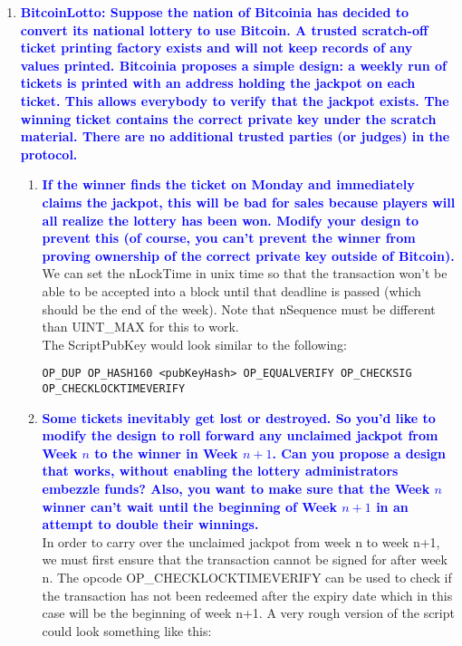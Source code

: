 \documentclass[11pt]{article}
\begin{document}
\begin{enumerate}
\item \textbf{\textcolor{blue}{BitcoinLotto: Suppose the nation of Bitcoinia has decided to convert its national lottery to use Bitcoin. A trusted scratch-off ticket printing factory exists and will not keep records of any values printed. Bitcoinia proposes a simple design: a weekly run of tickets is printed with an address holding the jackpot on each ticket. This allows everybody to verify that the jackpot exists. The winning ticket contains the correct private key under the scratch material. There are no additional trusted parties (or judges) in the protocol.}}
    \begin{enumerate}
    \item \textbf{\textcolor{blue}{If the winner finds the ticket on Monday and immediately claims the jackpot, this will be bad for sales because players will all realize the lottery has been won. Modify your design to prevent this (of course, you can’t prevent the winner from proving ownership of the correct private key outside of Bitcoin).}}
        \\ We can set the nLockTime in unix time so that the transaction won't be able to be accepted into a block until that deadline is passed (which should be the end of the week). Note that nSequence must be different than UINT\_MAX for this to work.
        \\ The ScriptPubKey would look similar to the following:
        \begin{verbatim}
OP_DUP OP_HASH160 <pubKeyHash> OP_EQUALVERIFY OP_CHECKSIG OP_CHECKLOCKTIMEVERIFY
        \end{verbatim}
        
    \item \textbf{\textcolor{blue}{Some tickets inevitably get lost or destroyed. So you’d like to modify the design to roll forward any unclaimed jackpot from Week $n$ to the winner in Week $n+1$. Can you propose a design that works, without enabling the lottery administrators embezzle funds? Also, you want to make sure that the Week $n$ winner can’t wait until the beginning of Week $n+1$ in an attempt to double their winnings.}}
        \\ In order to carry over the unclaimed jackpot from week n to week n+1, we must first ensure that the transaction cannot be signed for after week n. The opcode \linebreak OP\_CHECKLOCKTIMEVERIFY can be used to check if the transaction has not been redeemed after the expiry date which in this case will be the beginning of week n+1. A very rough version of the script could look something like this:
        

\end{enumerate}
\end{enumerate}
\end{document}

